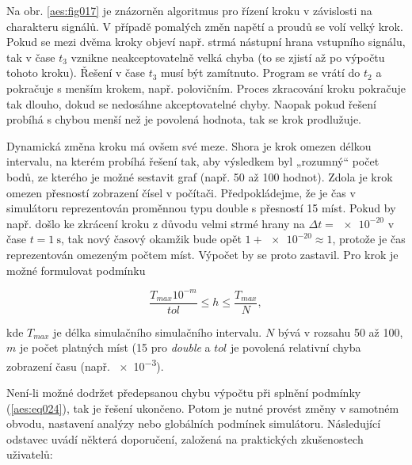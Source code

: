       Na obr. \ref{aes:fig017} je znázorněn algoritmus pro řízení kroku v závislosti na charakteru
      signálů. V případě pomalých změn napětí a proudů se volí velký krok. Pokud se mezi dvěma kroky
      objeví např. strmá nástupní hrana vstupního signálu, tak v čase \(t_3\) vznikne
      neakceptovatelně velká chyba (to se zjistí až po výpočtu tohoto kroku). Řešení v čase \(t_3\)
      musí být zamítnuto. Program se vrátí do \(t_2\) a pokračuje s menším krokem, např. polovičním.
      Proces zkracování kroku pokračuje tak dlouho, dokud se nedosáhne akceptovatelné chyby. Naopak
      pokud řešení probíhá s chybou menší než je povolená hodnota, tak se krok prodlužuje.

      

      Dynamická změna kroku má ovšem své meze. Shora je krok omezen délkou intervalu, na kterém
      probíhá řešení tak, aby výsledkem byl „rozumný“ počet bodů, ze kterého je možné sestavit graf
      (např. \num{50} až \num{100} hodnot). Zdola je krok omezen přesností zobrazení čísel v
      počítači. Předpokládejme, že je čas v simulátoru reprezentován proměnnou typu double s
      přesností \num{15} míst. Pokud by např. došlo ke zkrácení kroku z důvodu velmi strmé hrany na
      \(\Delta t = \num{e-20}\) v čase \(t = \SI{1}{\second}\), tak nový časový okamžik bude opět
      \(\num{1} + \num{e-20} \approx 1\), protože je čas reprezentován omezeným počtem míst. Výpočet
      by se proto zastavil. Pro krok je možné formulovat podmínku

      \begin{equation}\label{aes:eq024}
        \frac{T_{max}10^{-m}}{tol} \leq h \leq \frac{T_{max}}{N}, 
      \end{equation}

      kde \(T_{max}\) je délka simulačního simulačního intervalu. \(N\) bývá v rozsahu \num{50} až
      \num{100}, \(m\) je počet platných míst (\num{15} pro \emph{double} a \(tol\) je povolená
      relativní chyba zobrazení času (např. \num{e-3}).

      Není-li možné dodržet předepsanou chybu výpočtu při splnění podmínky (\ref{aes:eq024}), tak je
      řešení ukončeno. Potom je nutné provést změny v samotném obvodu, nastavení analýzy nebo
      globálních podmínek simulátoru. Následující odstavec uvádí některá doporučení, založená na
      praktických zkušenostech uživatelů:

